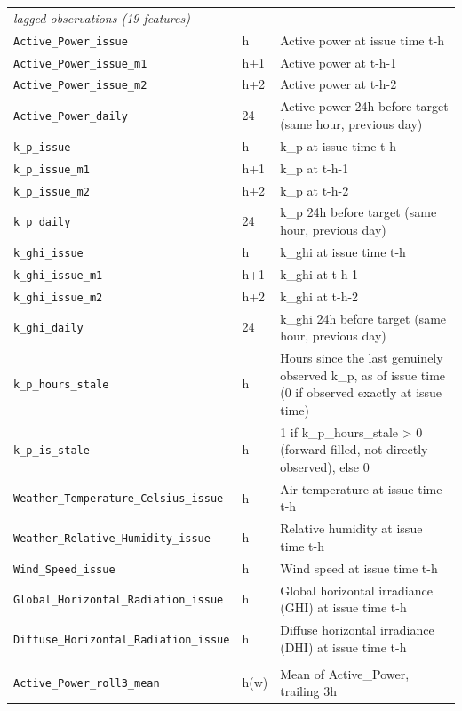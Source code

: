 \begin{table}[t]
\begin{tabular}{ll p{4.5cm}}
    \multicolumn{3}{l}{\textit{lagged observations (19 features)}} \\
    \texttt{Active\_Power\_issue} & h & Active power at issue time t-h \\
    \texttt{Active\_Power\_issue\_m1} & h+1 & Active power at t-h-1 \\
    \texttt{Active\_Power\_issue\_m2} & h+2 & Active power at t-h-2 \\
    \texttt{Active\_Power\_daily} & 24 & Active power 24h before target (same hour, previous day) \\
    \texttt{k\_p\_issue} & h & k\_p at issue time t-h \\
    \texttt{k\_p\_issue\_m1} & h+1 & k\_p at t-h-1 \\
    \texttt{k\_p\_issue\_m2} & h+2 & k\_p at t-h-2 \\
    \texttt{k\_p\_daily} & 24 & k\_p 24h before target (same hour, previous day) \\
    \texttt{k\_ghi\_issue} & h & k\_ghi at issue time t-h \\
    \texttt{k\_ghi\_issue\_m1} & h+1 & k\_ghi at t-h-1 \\
    \texttt{k\_ghi\_issue\_m2} & h+2 & k\_ghi at t-h-2 \\
    \texttt{k\_ghi\_daily} & 24 & k\_ghi 24h before target (same hour, previous day) \\
    \texttt{k\_p\_hours\_stale} & h & Hours since the last genuinely observed k\_p, as of issue time (0 if observed exactly at issue time) \\
    \texttt{k\_p\_is\_stale} & h & 1 if k\_p\_hours\_stale > 0 (forward-filled, not directly observed), else 0 \\
    \texttt{Weather\_Temperature\_Celsius\_issue} & h & Air temperature at issue time t-h \\
    \texttt{Weather\_Relative\_Humidity\_issue} & h & Relative humidity at issue time t-h \\
    \texttt{Wind\_Speed\_issue} & h & Wind speed at issue time t-h \\
    \texttt{Global\_Horizontal\_Radiation\_issue} & h & Global horizontal irradiance (GHI) at issue time t-h \\
    \texttt{Diffuse\_Horizontal\_Radiation\_issue} & h & Diffuse horizontal irradiance (DHI) at issue time t-h \\
    \addlinespace
    \multicolumn{3}{l}{\textit{rolling statistics (9 features)}} \\
    \texttt{Active\_Power\_roll3\_mean} & h(w) & Mean of Active\_Power, trailing 3h \\

\end{tabular}
\end{table}
